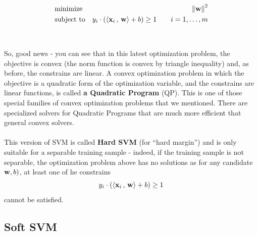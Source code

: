     \begin{eqnarray*}
      & \text{minimize}   &  \left\| \mathbf{w}\right\|^2 \\
     & \text{subject to} &  y_i \cdot \left( {\left\langle \mathbf{x}_i\,,\,\mathbf{w} \right\rangle}
      +b \right) \geq 1  \qquad 
i=1,\ldots,m
    \end{eqnarray*}
    \\~\\ So, good news - you can see that in this latest optimization problem,
    the objective is convex (the norm function is convex by triangle inequality)
    and, as before, the constrains are linear. 
    A convex optimization problem in which the objective is a quadratic form of
    the optimization variable, and the constrains are linear functions, is
    called {\bf a Quadratic Program} (QP). This is one of those special families
    of convex optimization problems that we mentioned. There are specialized
    solvers for Quadratic Programs that are much more efficient that general
    convex solvers. 
  \\~\\
  This version of SVM is called {\bf Hard SVM} (for ``hard margin'') and is
  only suitable for a separable training sample - indeed, if the training sample
  is not separable, the optimization problem above has no solutions as for any
candidate $\mathbf{w},b)$, at least
  one of he 
  constrains 
  \[
    y_i \cdot \left( {\left\langle \mathbf{x}_i\,,\,\mathbf{w} \right\rangle}
      +b \right) \geq 1  
  \]
  cannot be satisfied. 

  \subsection{Soft SVM}

